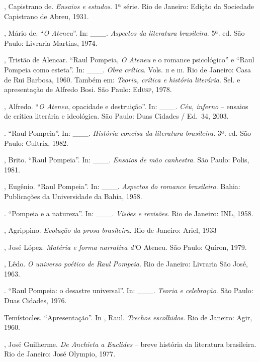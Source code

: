 \begin{bibliohedra}
, Capistrano de. \textit{Ensaios e estudos}.
1ª série. Rio de Janeiro: Edição da Sociedade
Capistrano de Abreu, 1931.

, Mário de. ``\textit{O Ateneu}''. In: \_\_\_. \textit{Aspectos da
literatura brasileira}. 5ª. ed. São Paulo: Livraria
Martins, 1974.

, Tristão de Alencar. ``Raul Pompeia,
\textit{O Ateneu} e o romance psicológico'' e ``Raul Pompeia como
esteta''. In: \_\_\_. \textit{Obra crítica}. Vols. \textsc{ii} e \textsc{iii}. Rio de
Janeiro: Casa de Rui Barbosa, 1960. Também em: \textit{Teoria, crítica
e história literária}. Sel. e apresentação de Alfredo Bosi. São Paulo:
Ed\textsc{usp}, 1978.  

, Alfredo. ``\textit{O Ateneu}, opacidade e
destruição''. In: \_\_\_. \textit{Céu, inferno} -- ensaios de crítica
literária e ideológica. São Paulo: Duas Cidades / Ed.~34, 2003.

\titidem. ``Raul Pompeia''. In: \_\_\_. \textit{História concisa da
literatura brasileira}. 3ª. ed. São Paulo: Cultrix,
1982.

, Brito. ``Raul Pompeia''. In: \_\_\_. 
\textit{Ensaios de mão canhestra}. São Paulo: Polis, 1981.

, Eugênio. ``Raul Pompeia''. In: \_\_\_.
\textit{Aspectos do romance brasileiro}. Bahia: Publicações da
Universidade da Bahia, 1958.

\titidem. ``Pompeia e a natureza''. In: \_\_\_. \textit{Visões e
revisões}. Rio de Janeiro: INL, 1958.

, Agrippino. \textit{Evolução da prosa brasileira}. Rio
de Janeiro: Ariel, 1933

, José López. \textit{Matéria e forma narrativa
d'}O Ateneu. São Paulo: Quíron, 1979.

, Lêdo. \textit{O universo poético de Raul Pompeia}.
Rio de Janeiro: Livraria São José, 1963.

\titidem. ``Raul Pompeia: o desastre universal''. In: \_\_\_.
\textit{Teoria e celebração}. São Paulo: Duas Cidades, 1976.

 Temístocles. ``Apresentação''. In , Raul.
\textit{Trechos escolhidos}. Rio de Janeiro: Agir, 1960.

, José Guilherme. \textit{De Anchieta a Euclides} -- breve
história da literatura brasileira. Rio de Janeiro: José Olympio, 1977.


\end{bibliohedra}
